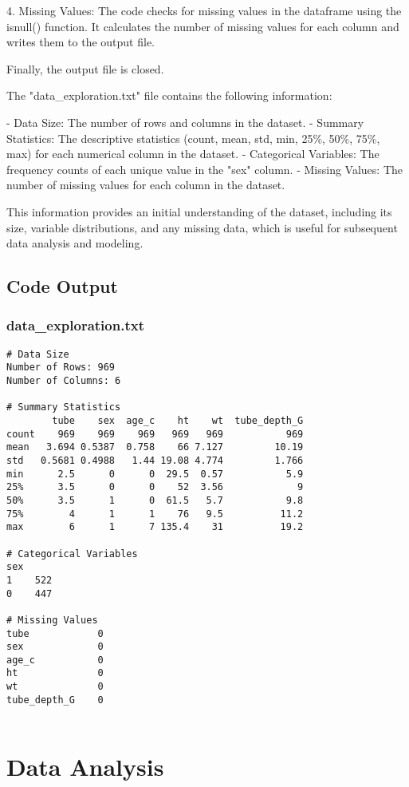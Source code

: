 \documentclass[11pt]{article}
\begin{document}
4. Missing Values:
   The code checks for missing values in the dataframe using the isnull() function. It calculates the number of missing values for each column and writes them to the output file.

Finally, the output file is closed.

The "data\_exploration.txt" file contains the following information:

- Data Size: The number of rows and columns in the dataset.
- Summary Statistics: The descriptive statistics (count, mean, std, min, 25\%, 50\%, 75\%, max) for each numerical column in the dataset.
- Categorical Variables: The frequency counts of each unique value in the "sex" column.
- Missing Values: The number of missing values for each column in the dataset.

This information provides an initial understanding of the dataset, including its size, variable distributions, and any missing data, which is useful for subsequent data analysis and modeling.

\subsection{Code Output}

\subsubsection*{data\_exploration.txt}

\begin{Verbatim}[tabsize=4]
# Data Size
Number of Rows: 969
Number of Columns: 6

# Summary Statistics
        tube    sex  age_c    ht    wt  tube_depth_G
count    969    969    969   969   969           969
mean   3.694 0.5387  0.758    66 7.127         10.19
std   0.5681 0.4988   1.44 19.08 4.774         1.766
min      2.5      0      0  29.5  0.57           5.9
25%      3.5      0      0    52  3.56             9
50%      3.5      1      0  61.5   5.7           9.8
75%        4      1      1    76   9.5          11.2
max        6      1      7 135.4    31          19.2

# Categorical Variables
sex
1    522
0    447

# Missing Values
tube            0
sex             0
age_c           0
ht              0
wt              0
tube_depth_G    0


\end{Verbatim}

\section{Data Analysis}
\end{document}
